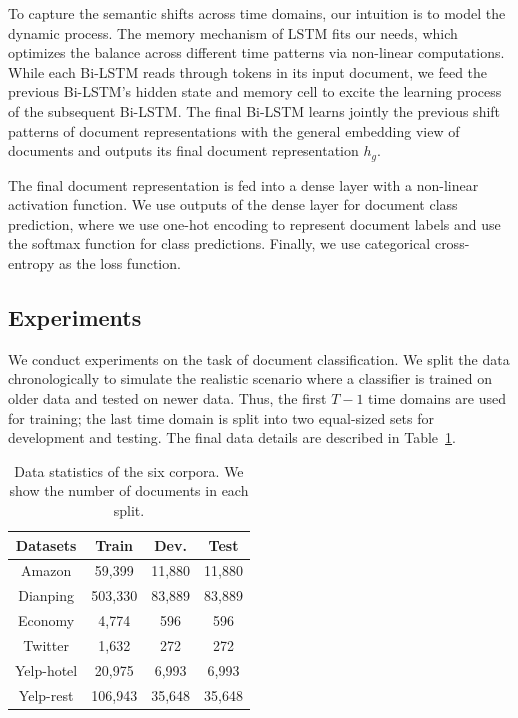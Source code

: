 To capture the semantic shifts across time domains, our intuition is to model the dynamic process. The memory mechanism of LSTM fits our needs, which optimizes the balance across different time patterns via non-linear computations. While each Bi-LSTM reads through tokens in its input document, we feed the previous Bi-LSTM's hidden state and memory cell to excite the learning process of the subsequent Bi-LSTM. The final Bi-LSTM learns jointly the previous shift patterns of document representations with the general embedding view of documents and outputs its final document representation $h_g$. 

The final document representation is fed into a dense layer with a non-linear activation function. We use outputs of the dense layer for document class prediction,
where we use one-hot encoding to represent document labels and use the softmax function for class predictions. Finally, we use categorical cross-entropy as the loss function.



\subsection{Experiments}
\label{chap3:sec:dweExp}

We conduct experiments on the task of document classification.
We split the data chronologically to simulate the realistic scenario where a classifier is trained on older data and tested on newer data. 
Thus, the first $T-1$ time domains are used for training;
the last time domain is split into two equal-sized sets for development and testing.
The final data details are described in Table~\ref{chap3:table:statics}.

\begin{table}[ht]
 \centering
    \begin{tabular}{c|ccc}
    \hline\hline
    Datasets & Train & Dev. & Test\\
    \hline
    Amazon & 59,399 & 11,880 & 11,880 \\
    Dianping & 503,330 & 83,889 & 83,889 \\
    Economy & 4,774 & 596 & 596\\
    Twitter & 1,632 & 272 & 272\\
    Yelp-hotel & 20,975 & 6,993 & 6,993 \\
    Yelp-rest & 106,943 & 35,648 & 35,648 \\
    \hline
    \end{tabular}
    \caption{Data statistics of the six corpora. We show the number of documents in each split.}
    \label{chap3:table:statics}
\end{table}


